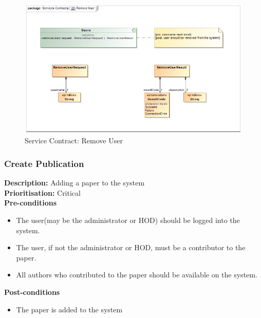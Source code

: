 \documentclass[a4paper]{article}
\begin{document}
    	\begin{figure}[H]
    		\centering
    		\includegraphics[width=\textwidth]{5.1.4.Remove.User.Services.Contract.png}
    		\caption{Service Contract: Remove User}
    	\end{figure}
\pagebreak
    \subsubsection{Create Publication}
    
    \textbf{Description:} Adding a paper to the system\\
    \textbf{Prioritisation:} Critical\\
    
    
    \textbf{Pre-conditions}
     \begin{itemize}
        \item The user(may be the administrator or HOD) should be logged into the system.
        \item The user, if not the administrator or HOD, must be a contributor to the paper.
        \item All authors who contributed to the paper should be available on the system.
   \end{itemize}
    
    \textbf{Post-conditions}
    \begin{itemize}
        \item The paper is added to the system
    \end{itemize}
    
\end{document}

